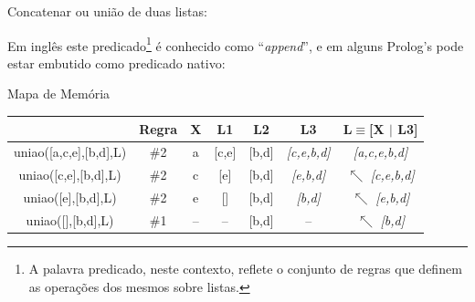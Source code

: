 \documentclass[sans]{beamer}
\begin{document}

\begin{frame}
\begin{block}{Concatenar ou união de duas listas:}

Em inglês este predicado\footnote{A palavra predicado, neste contexto, 
 reflete o conjunto de regras que definem as operações dos mesmos sobre listas.} é conhecido como ``{\em append}'', 
 e em alguns Prolog's pode estar embutido como predicado nativo:


\end{block}
\end{frame}
\begin{frame}

\begin{block} {Mapa de Memória}
{\scriptsize
\begin{center}
\begin{tabular}
[c]{c|c|c|c|c|c|c}\hline \hline
& \textbf{Regra} & \textbf{X} & \textbf{L1} & \textbf{L2} & \textbf{L3} & \textbf{L$\equiv$[X $\vert$ L3]} \\ \hline \hline
uniao([a,c,e],[b,d],L) & \#2 & a & [c,e] & [b,d] & \emph{[c,e,b,d]} & \emph{[a,c,e,b,d]}  \\\hline
uniao([c,e],[b,d],L) & \#2 & c & [e] & [b,d] & \emph{[e,b,d]} & $\nwarrow$  \emph{[c,e,b,d]} \\\hline
uniao([e],[b,d],L) & \#2 & e & [] & [b,d] & \emph{[b,d]} & $\nwarrow$  \emph{[e,b,d]} \\\hline
uniao([],[b,d],L) & \#1 & -- & -- & [b,d] & -- & $\nwarrow$  \emph{[b,d]} \\\hline \hline
\end{tabular}%
\end{center}
}
\end{block}    
\end{frame}
\end{document}
